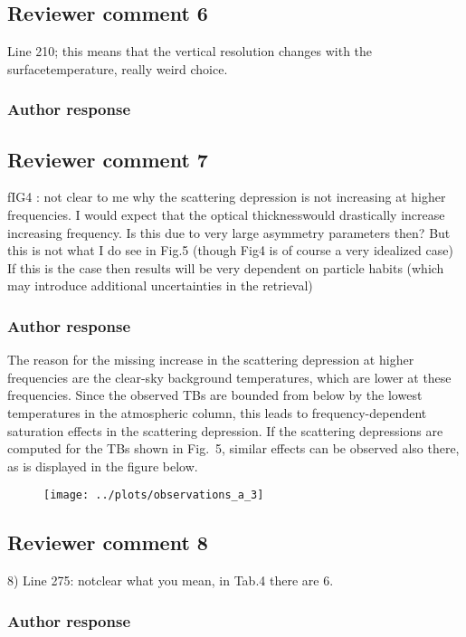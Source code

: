 \documentclass[11pt]{scrartcl}
\begin{document}
\subsection*{Reviewer comment 6}
Line 210; this means that the vertical resolution changes with the surfacetemperature, really weird choice.

\subsubsection*{Author response}

\subsection*{Reviewer comment 7}
fIG4 : not clear to me why the scattering depression is not increasing at
higher frequencies. I would expect that the optical thicknesswould drastically
increase increasing frequency. Is this due to very large asymmetry parameters
then? But this is not what I do see in Fig.5 (though Fig4 is of course a very
idealized case) If this is the case then results will be very dependent on
particle habits (which may introduce additional uncertainties in the retrieval)

\subsubsection*{Author response}

The reason for the missing increase in the scattering depression at higher
frequencies are the clear-sky background temperatures, which are lower at these
frequencies. Since the observed TBs are bounded from below by the lowest temperatures
in the atmospheric column, this leads to frequency-dependent saturation effects
in the scattering depression. If the scattering depressions are computed for the
TBs shown in Fig.~5, similar effects can be observed also there, as is displayed
in the figure below.

\begin{figure}[!hbpt]
  \centering
  \texttt{[image: ../plots/observations\_a\_3]}
\end{figure}

\subsection*{Reviewer comment 8}
8) Line 275: notclear what you mean, in Tab.4 there are 6. 

\subsubsection*{Author response}
\end{document}
